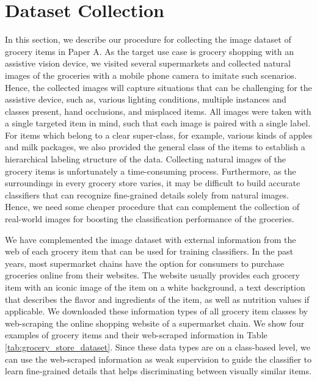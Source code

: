 \section{Dataset Collection}\label{chap3:sec:dataset_collection}
In this section, we describe our procedure for collecting the image dataset of grocery items in Paper A. As the target use case is grocery shopping with an assistive vision device, we visited several supermarkets and collected natural images of the groceries with a mobile phone camera to imitate such scenarios. Hence, the collected images will capture situations that can be challenging for the assistive device, such as, various lighting conditions, multiple instances and classes present, hand occlusions, and misplaced items. All images were taken with a single targeted item in mind, such that each image is paired with a single label. For items which belong to a clear super-class, for example, various kinds of apples and milk packages, we also provided the general class of the items to establish a hierarchical labeling structure of the data. Collecting natural images of the grocery items is unfortunately a time-consuming process. Furthermore, as the surroundings in every grocery store varies, it may be difficult to build accurate classifiers that can recognize fine-grained details solely from natural images. Hence, we need some cheaper procedure that can complement the collection of real-world images for boosting the classification performance of the groceries. 

We have complemented the image dataset with external information from the web of each grocery item that can be used for training classifiers. In the past years, most supermarket chains have the option for consumers to purchase groceries online from their websites. The website usually provides each grocery item with an iconic image of the item on a white background, a text description that describes the flavor and ingredients of the item, as well as nutrition values if applicable. We downloaded these information types of all grocery item classes by web-scraping the online shopping website of a supermarket chain. We show four examples of grocery items and their web-scraped information in Table \ref{tab:grocery_store_dataset}. Since these data types are on a class-based level, we can use the web-scraped information as weak supervision to guide the classifier to learn fine-grained details that helps discriminating between visually similar items.   

